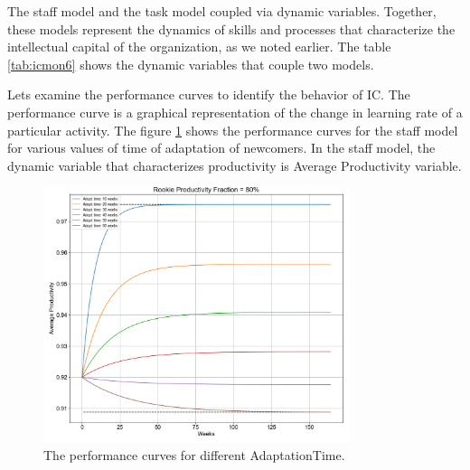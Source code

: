 \documentclass[12pt]{report}
\theoremstyle{definition}
\begin{document}
The staff model and the task model coupled via dynamic variables. 
Together, these models represent the dynamics of skills and processes that characterize the intellectual capital of the organization, as we noted earlier.
The table \ref{tab:icmon6} shows the dynamic variables that couple two models.

\begin{table}[H]
	\centering
	\caption{The dynamic variables that couple the staff model and the task model.}
	\label{tab:icmon6}
\end{table}

Lets examine the performance curves to identify the behavior of IC.  
The performance curve is a graphical representation of the change in learning rate of a particular activity. 
The figure \ref{fig:icmon3} shows the performance curves for the staff model for various values of time of adaptation of newcomers. 
In the staff model, the dynamic variable that characterizes productivity is Average Productivity variable.

\begin{figure}[H]
	\centering
	\includegraphics[width=0.8\textwidth]{icmon3}
	\caption{The performance curves for different AdaptationTime.}
	\label{fig:icmon3}
\end{figure}  
\end{document}

